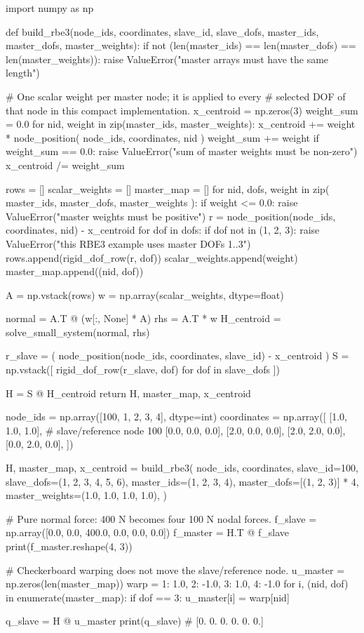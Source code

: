 \begin{python}
import numpy as np


def build_rbe3(node_ids, coordinates, slave_id, slave_dofs,
               master_ids, master_dofs, master_weights):
    if not (len(master_ids) == len(master_dofs) == len(master_weights)):
        raise ValueError("master arrays must have the same length")

    # One scalar weight per master node; it is applied to every
    # selected DOF of that node in this compact implementation.
    x_centroid = np.zeros(3)
    weight_sum = 0.0
    for nid, weight in zip(master_ids, master_weights):
        x_centroid += weight * node_position(
            node_ids, coordinates, nid
        )
        weight_sum += weight
    if weight_sum == 0.0:
        raise ValueError("sum of master weights must be non-zero")
    x_centroid /= weight_sum

    rows = []
    scalar_weights = []
    master_map = []
    for nid, dofs, weight in zip(
        master_ids, master_dofs, master_weights
    ):
        if weight <= 0.0:
            raise ValueError("master weights must be positive")
        r = node_position(node_ids, coordinates, nid) - x_centroid
        for dof in dofs:
            if dof not in (1, 2, 3):
                raise ValueError("this RBE3 example uses master DOFs 1..3")
            rows.append(rigid_dof_row(r, dof))
            scalar_weights.append(weight)
            master_map.append((nid, dof))

    A = np.vstack(rows)
    w = np.array(scalar_weights, dtype=float)

    normal = A.T @ (w[:, None] * A)
    rhs = A.T * w
    H_centroid = solve_small_system(normal, rhs)

    r_slave = (
        node_position(node_ids, coordinates, slave_id) - x_centroid
    )
    S = np.vstack([
        rigid_dof_row(r_slave, dof) for dof in slave_dofs
    ])

    H = S @ H_centroid
    return H, master_map, x_centroid


node_ids = np.array([100, 1, 2, 3, 4], dtype=int)
coordinates = np.array([
    [1.0, 1.0, 1.0],  # slave/reference node 100
    [0.0, 0.0, 0.0],
    [2.0, 0.0, 0.0],
    [2.0, 2.0, 0.0],
    [0.0, 2.0, 0.0],
])

H, master_map, x_centroid = build_rbe3(
    node_ids, coordinates,
    slave_id=100,
    slave_dofs=(1, 2, 3, 4, 5, 6),
    master_ids=(1, 2, 3, 4),
    master_dofs=[(1, 2, 3)] * 4,
    master_weights=(1.0, 1.0, 1.0, 1.0),
)

# Pure normal force: 400 N becomes four 100 N nodal forces.
f_slave = np.array([0.0, 0.0, 400.0, 0.0, 0.0, 0.0])
f_master = H.T @ f_slave
print(f_master.reshape(4, 3))

# Checkerboard warping does not move the slave/reference node.
u_master = np.zeros(len(master_map))
warp = {1: 1.0, 2: -1.0, 3: 1.0, 4: -1.0}
for i, (nid, dof) in enumerate(master_map):
    if dof == 3:
        u_master[i] = warp[nid]

q_slave = H @ u_master
print(q_slave)
# [0. 0. 0. 0. 0. 0.]
\end{python}

